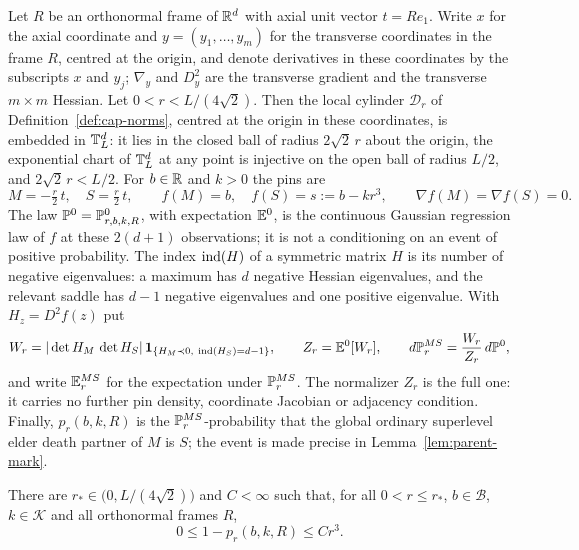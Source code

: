 \begin{definition}\label{def:parent-pinned}
Let $R$ be an orthonormal frame of $\mathbb R^d$ with axial unit vector $t=Re_1$. Write $x$ for the axial coordinate and $y=(y_1,\dots,y_m)$ for the transverse coordinates in the frame $R$, centred at the origin, and denote derivatives in these coordinates by the subscripts $x$ and $y_j$; $\nabla_y$ and $D_y^2$ are the transverse gradient and the transverse $m\times m$ Hessian. Let $0<r<L/(4\sqrt2)$. Then the local cylinder $\mathcal D_r$ of Definition~\ref{def:cap-norms}, centred at the origin in these coordinates, is embedded in $\mathbb T^d_L$: it lies in the closed ball of radius $2\sqrt2\,r$ about the origin, the exponential chart of $\mathbb T^d_L$ at any point is injective on the open ball of radius $L/2$, and $2\sqrt2\,r<L/2$. For $b\in\mathbb R$ and $k>0$ the pins are
\begin{equation}\label{eq:parent-pins}
M=-\tfrac r2\,t,\quad S=\tfrac r2\,t,\qquad f(M)=b,\quad f(S)=s:=b-kr^3,\qquad \nabla f(M)=\nabla f(S)=0 .
\end{equation}
The law $\mathbb P^0=\mathbb P^0_{r,b,k,R}$, with expectation $\mathbb E^0$, is the continuous Gaussian regression law of $f$ at these $2(d+1)$ observations; it is not a conditioning on an event of positive probability. The index $\operatorname{ind}(H)$ of a symmetric matrix $H$ is its number of negative eigenvalues: a maximum has $d$ negative Hessian eigenvalues, and the relevant saddle has $d-1$ negative eigenvalues and one positive eigenvalue. With $H_z=D^2f(z)$ put
\begin{equation}\label{eq:parent-W}
W_r=|\det H_M\,\det H_S|\,\mathbf 1_{\{H_M\prec0,\ \operatorname{ind}(H_S)=d-1\}},\qquad Z_r=\mathbb E^0[W_r],\qquad d\mathbb P^{MS}_r=\frac{W_r}{Z_r}\,d\mathbb P^0 ,
\end{equation}
and write $\mathbb E^{MS}_r$ for the expectation under $\mathbb P^{MS}_r$. The normalizer $Z_r$ is the full one: it carries no further pin density, coordinate Jacobian or adjacency condition. Finally, $p_r(b,k,R)$ is the $\mathbb P^{MS}_r$-probability that the global ordinary superlevel elder death partner of $M$ is $S$; the event is made precise in Lemma~\ref{lem:parent-mark}.
\end{definition}

\begin{theorem}\label{thm:parent-A}
There are $r_*\in\bigl(0,L/(4\sqrt2)\bigr)$ and $C<\infty$ such that, for all $0<r\le r_*$, $b\in\mathcal B$, $k\in\mathcal K$ and all orthonormal frames $R$,
\begin{equation}\label{eq:parent-A}
0\le1-p_r(b,k,R)\le Cr^3 .
\end{equation}
\end{theorem}

